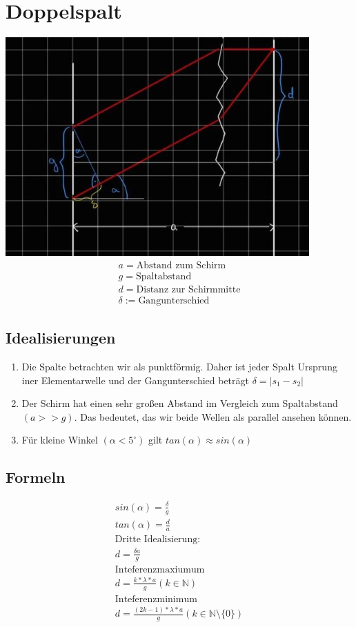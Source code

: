 \documentclass{article}
\begin{document}
\section*{Doppelspalt}
\includegraphics[width=\textwidth]{dp.png}
\begin{align}
    a = \text{Abstand zum Schirm} \\
    g = \text{Spaltabstand} \\
    d = \text{Distanz zur Schirmmitte} \\
    \delta := \text{Gangunterschied}
\end{align}
\subsection*{Idealisierungen}
\begin{enumerate}
    \item Die Spalte betrachten wir als punktförmig. Daher ist jeder Spalt Ursprung iner Elementarwelle und der Gangunterschied beträgt
    $\delta = |s_1 - s_2|$
    \item Der Schirm hat einen sehr großen Abstand im  Vergleich zum Spaltabstand $(a>>g)$. Das bedeutet, das wir beide Wellen als
    parallel ansehen können.
    \item Für kleine Winkel $(\alpha < 5^\circ)$ gilt $tan(\alpha)\approx sin(\alpha)$
\end{enumerate}
\subsection*{Formeln}
\begin{align*}
    sin(\alpha)=\frac{\delta}{g}\\
    tan(\alpha)=\frac{d}{a}\\
    \text{Dritte Idealisierung:}\\
    d = \frac{\delta a}{g}\\
    \text{Inteferenzmaxiumum}\\
    d = \frac{k*\lambda*a}{g} (k\in \mathbb{N})\\
    \text{Inteferenzminimum}\\
    d = \frac{(2k-1)*\lambda*a}{g} (k \in \mathbb{N}\text{\textbackslash}\{0\})
\end{align*}
\end{document}

